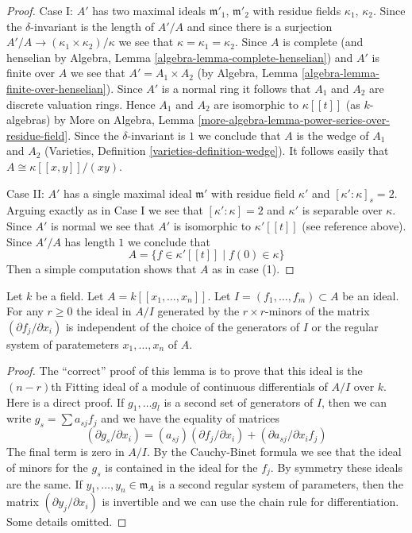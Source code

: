 \begin{proof}
\medskip\noindent
Case I: $A'$ has two maximal ideals $\mathfrak m'_1$, $\mathfrak m'_2$
with residue fields $\kappa_1$, $\kappa_2$.
Since the $\delta$-invariant is the length of $A'/A$ and
since there is a surjection $A'/A \to (\kappa_1 \times \kappa_2)/\kappa$
we see that $\kappa = \kappa_1 = \kappa_2$. Since $A$ is complete
(and henselian by Algebra, Lemma \ref{algebra-lemma-complete-henselian})
and $A'$ is finite over $A$ we see that $A' = A_1 \times A_2$
(by Algebra, Lemma \ref{algebra-lemma-finite-over-henselian}).
Since $A'$ is a normal ring it follows that $A_1$ and $A_2$ are
discrete valuation rings.
Hence $A_1$ and $A_2$ are isomorphic to $\kappa[[t]]$
(as $k$-algebras) by
More on Algebra, Lemma \ref{more-algebra-lemma-power-series-over-residue-field}.
Since the $\delta$-invariant is $1$ we conclude that $A$
is the wedge of $A_1$ and $A_2$
(Varieties, Definition \ref{varieties-definition-wedge}).
It follows easily that $A \cong \kappa[[x, y]]/(xy)$.

\medskip\noindent
Case II: $A'$ has a single maximal ideal $\mathfrak m'$ with residue
field $\kappa'$ and $[\kappa' : \kappa]_s = 2$. Arguing exactly
as in Case I we see that $[\kappa' : \kappa] = 2$ and $\kappa'$
is separable over $\kappa$. Since $A'$ is normal we see that
$A'$ is isomorphic to $\kappa'[[t]]$ (see reference above).
Since $A'/A$ has length $1$ we conclude that
$$
A = \{f \in \kappa'[[t]] \mid f(0) \in \kappa\}
$$
Then a simple computation shows that $A$ as in case (1).
\end{proof}

\begin{lemma}
\label{lemma-fitting-ideal-well-defined}
Let $k$ be a field. Let $A = k[[x_1, \ldots, x_n]]$. Let
$I = (f_1, \ldots, f_m) \subset A$ be an ideal. For any
$r \geq 0$ the ideal in $A/I$ generated by the $r \times r$-minors
of the matrix $(\partial f_j/\partial x_i)$ is independent
of the choice of the generators of $I$ or the
regular system of paratemeters $x_1, \ldots, x_n$ of $A$.
\end{lemma}

\begin{proof}
The ``correct'' proof of this lemma is to prove that this ideal
is the $(n - r)$th Fitting ideal of a module of continuous differentials
of $A/I$ over $k$. Here is a direct proof.
If $g_1, \ldots g_l$ is a second set of generators of $I$, then
we can write $g_s = \sum a_{sj}f_j$ and we have the equality of matrices
$$
(\partial g_s/\partial x_i) = (a_{sj}) (\partial f_j/\partial x_i)
+ (\partial a_{sj}/\partial x_i f_j)
$$
The final term is zero in $A/I$.
By the Cauchy-Binet formula we see that the ideal of minors for the
$g_s$ is contained in the ideal for the $f_j$. By symmetry
these ideals are the same. If $y_1, \ldots, y_n \in \mathfrak m_A$
is a second regular system of parameters, then the matrix
$(\partial y_j/\partial x_i)$
is invertible and we can use the chain rule for differentiation.
Some details omitted.
\end{proof}

